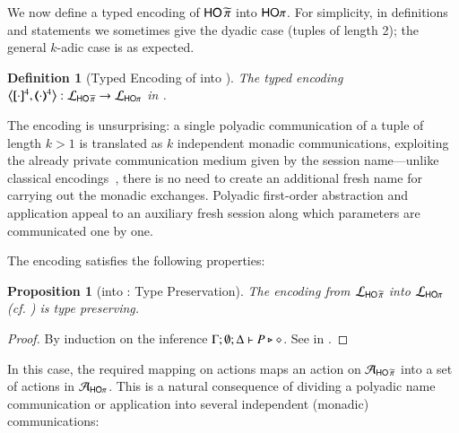 \documentclass[preprint,11pt]{elsarticle}
\newtheorem{definition}{Definition}[section]
\newtheorem{proposition}{Proposition}[section]
\begin{document}
{We now define a typed encoding of 
$\mathsf{HO}\,{\widetilde{\pi}}$ into $\mathsf{HO}\pi$. For simplicity, in definitions and statements we sometimes give the dyadic case (tuples of length 2);
the general $k$-adic case is as expected.

\begin{definition}[Typed Encoding of \PHOp into \HOp]
\label{d:enc:phoptohop}
The typed encoding
	$\enco{\pmap{\cdot}{4}, \tmap{\cdot}{4}}: \tyl{L}_{\PHOp} \to \tyl{L}_{\HOp}$ 
in .
\end{definition}

The encoding is unsurprising: a single polyadic communication of a tuple of length $k > 1$
is translated as $k$ independent monadic communications, exploiting the already private communication medium given by the session name---unlike classical encodings~\cite{MilnerTR91}, there is no need to create an additional fresh name for carrying out the monadic exchanges.
Polyadic first-order abstraction and application appeal to an auxiliary fresh session along which   parameters are communicated one by one.

The encoding satisfies the following properties:


{
\begin{proposition}[\PHOp into \HOp: Type Preservation]
\label{prop:typepres_pHOp_to_HOp}
The encoding from
		$\mathcal{L}_{\mathsf{HO}\,{\widetilde{\pi}}}$ into $\mathcal{L}_{\mathsf{HO}\pi}$ (cf. )
is type preserving.
\end{proposition}}

\begin{proof}
	By induction on the inference $\Gamma; \emptyset; \Delta \vdash P \triangleright \diamond$.
	See  in .
	\end{proof}
	
In this case, the required mapping on actions 
maps an action on $\mathcal{A}_{\mathsf{HO}\,{\widetilde{\pi}}}$ into a set of actions in $\mathcal{A}_{\mathsf{HO}\pi}$.
This is a natural consequence of dividing a polyadic name communication or application into several
independent (monadic) communications:

}
\end{document}
